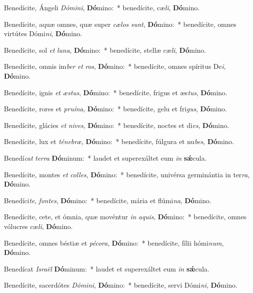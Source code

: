 \item Benedícite, Ángeli \textit{Dó}\textit{mi}\textit{ni}, \textbf{Dó}mino:~* benedícite, cæ\textit{li}, \textbf{Dó}mino.
\item Benedícite, aquæ omnes, quæ super \textit{cæ}\textit{los} \textit{sunt}, \textbf{Dó}mino:~* benedícite, omnes virtútes Dómi\textit{ni}, \textbf{Dó}mino.
\item Benedícite, sol \textit{et} \textit{lu}\textit{na}, \textbf{Dó}mino:~* benedícite, stellæ cæ\textit{li}, \textbf{Dó}mino.
\item Benedícite, omnis im\textit{ber} \textit{et} \textit{ros}, \textbf{Dó}mino:~* benedícite, omnes spíritus De\textit{i}, \textbf{Dó}mino.
\item Benedícite, ignis \textit{et} \textit{æs}\textit{tus}, \textbf{Dó}mino:~* benedícite, frigus et æs\textit{tus}, \textbf{Dó}mino.
\item Benedícite, rores et \textit{pru}\textit{í}\textit{na}, \textbf{Dó}mino:~* benedícite, gelu et fri\textit{gus}, \textbf{Dó}mino.
\item Benedícite, glácies \textit{et} \textit{ni}\textit{ves}, \textbf{Dó}mino:~* benedícite, noctes et di\textit{es}, \textbf{Dó}mino.
\item Benedícite, lux et \textit{té}\textit{ne}\textit{bræ}, \textbf{Dó}mino:~* benedícite, fúlgura et nu\textit{bes}, \textbf{Dó}mino.
\item Benedí\textit{cat} \textit{ter}\textit{ra} \textbf{Dó}minum:~* laudet et superexáltet eum \textit{in} \textbf{sǽ}cula.
\item Benedícite, montes \textit{et} \textit{col}\textit{les}, \textbf{Dó}mino:~* benedícite, univérsa germinántia in ter\textit{ra}, \textbf{Dó}mino.
\item Benedíci\textit{te}, \textit{fon}\textit{tes}, \textbf{Dó}mino:~* benedícite, mária et flúmi\textit{na}, \textbf{Dó}mino.
\item Benedícite, cete, et ómnia, quæ movéntur \textit{in} \textit{a}\textit{quis}, \textbf{Dó}mino:~* benedícite, omnes vólucres cæ\textit{li}, \textbf{Dó}mino.
\item Benedícite, omnes béstiæ et \textit{pé}\textit{co}\textit{ra}, \textbf{Dó}mino:~* benedícite, fílii hómi\textit{num}, \textbf{Dó}mino.
\item Benedícat \textit{Is}\textit{ra}\textit{ël} \textbf{Dó}minum:~* laudet et superexáltet eum \textit{in} \textbf{sǽ}cula.
\item Benedícite, sacerdótes \textit{Dó}\textit{mi}\textit{ni}, \textbf{Dó}mino:~* benedícite, servi Dómi\textit{ni}, \textbf{Dó}mino.
